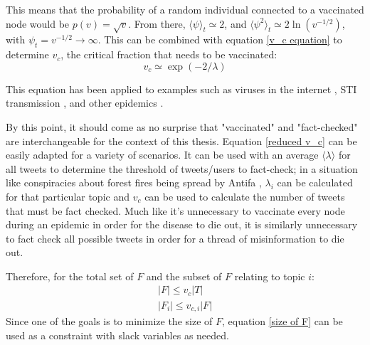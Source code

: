 \documentclass[NETN,manuscript]{stjour-new}
\begin{document}
This means that the probability of a random individual connected to a vaccinated node would be $p(v) = \sqrt{v}$. From there, $\langle \psi \rangle_t \simeq 2$, and $\langle \psi^2 \rangle_t \simeq 2 \ln(v^{-1/2})$, with $\psi_t = v^{-1/2} \rightarrow \infty$. This can be combined with equation \ref{v_c equation} to determine $v_c$, the critical fraction that needs to be vaccinated:
\begin{equation}
\label{reduced v_c} 
    v_c \simeq \exp{(-2/\lambda)}
\end{equation}

This equation has  been applied to examples such as viruses in the internet \citep{kephart1993computers}, STI transmission \citep{anderson1992infectious,lloyd2001viruses}, and other epidemics \citep{diekmann2000mathematical}. 

By this point, it should come as no surprise that "vaccinated" and "fact-checked" are interchangeable for the context of this thesis. Equation \ref{reduced v_c} can be easily adapted for a variety of scenarios. It can be used with an average $\langle \lambda \rangle$ for all tweets to determine the threshold of tweets/users to fact-check; in a situation like conspiracies about forest fires being spread by Antifa \citep{robinson2020oregon}, $\lambda_i$ can be calculated for that particular topic and $v_c$ can be used to calculate the number of tweets that must be fact checked. Much like it's unnecessary to vaccinate every node during an epidemic in order for the disease to die out, it is similarly unnecessary to fact check all possible tweets in order for a thread of misinformation to die out.

Therefore, for the total set of $F$ and the subset of $F$ relating to topic $i$: 
\begin{equation}
    \label{size of F}
    \begin{split}
    |F| \leq v_{c}|T| \\
    |F_{i}| \leq v_{c,i}|F|
    \end{split}
\end{equation}
Since one of the goals is to minimize the size of $F$, equation \ref{size of F} can be used as a constraint with slack variables as needed.
\end{document}
